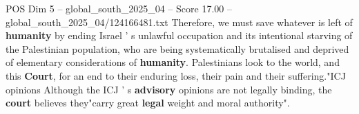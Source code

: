 \begin{textsample}{POS Dim 5 – global\_south\_2025\_04 – Score 17.00 – global\_south\_2025\_04/124166481.txt}
Therefore, we must save whatever is left of \textbf{humanity} by ending Israel ' s unlawful occupation and its intentional starving of the Palestinian population, who are being systematically brutalised and deprived of elementary considerations of \textbf{humanity}.
Palestinians look to the world, and this \textbf{Court}, for an end to their enduring loss, their pain and their suffering."ICJ opinions Although the ICJ ' s \textbf{advisory} opinions are not legally binding, the \textbf{court} believes they"carry great \textbf{legal} weight and moral authority".

\end{textsample}
